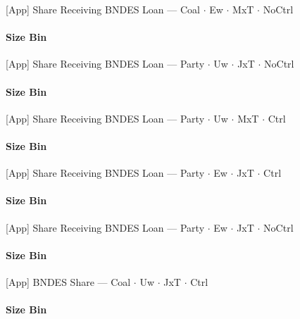 \documentclass[aspectratio=169,10pt]{beamer}
\newcommand{\tsize}{../tables/agg_firm_size_bin}
\begin{document}
\begin{frame}[t,shrink=5]{[App] Share Receiving BNDES Loan --- Coal $\cdot$ Ew $\cdot$ MxT $\cdot$ NoCtrl}
\framesubtitle{Size Bin}
\begin{center}\footnotesize

\end{center}
\end{frame}

\begin{frame}[t,shrink=5]{[App] Share Receiving BNDES Loan --- Party $\cdot$ Uw $\cdot$ JxT $\cdot$ NoCtrl}
\framesubtitle{Size Bin}
\begin{center}\footnotesize

\end{center}
\end{frame}

\begin{frame}[t,shrink=5]{[App] Share Receiving BNDES Loan --- Party $\cdot$ Uw $\cdot$ MxT $\cdot$ Ctrl}
\framesubtitle{Size Bin}
\begin{center}\footnotesize

\end{center}
\end{frame}

\begin{frame}[t,shrink=5]{[App] Share Receiving BNDES Loan --- Party $\cdot$ Ew $\cdot$ JxT $\cdot$ Ctrl}
\framesubtitle{Size Bin}
\begin{center}\footnotesize

\end{center}
\end{frame}

\begin{frame}[t,shrink=5]{[App] Share Receiving BNDES Loan --- Party $\cdot$ Ew $\cdot$ JxT $\cdot$ NoCtrl}
\framesubtitle{Size Bin}
\begin{center}\footnotesize

\end{center}
\end{frame}

\begin{frame}[t,shrink=5]{[App] BNDES Share --- Coal $\cdot$ Uw $\cdot$ JxT $\cdot$ Ctrl}
\framesubtitle{Size Bin}
\begin{center}\footnotesize

\end{center}
\end{frame}
\end{document}
